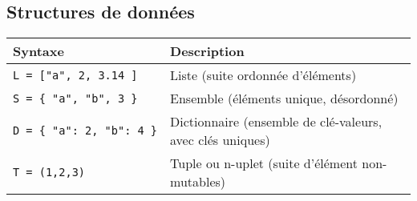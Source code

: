 \documentclass[]{article}
\begin{document}
\hypertarget{structures-de-donnuxe9es}{%
\subsection{Structures de données}\label{structures-de-donnuxe9es}}

\begin{longtable}[]{@{}ll@{}}
\toprule
\begin{minipage}[b]{0.28\columnwidth}\raggedright
Syntaxe\strut
\end{minipage} & \begin{minipage}[b]{0.67\columnwidth}\raggedright
Description\strut
\end{minipage}\tabularnewline
\midrule
\endhead
\begin{minipage}[t]{0.28\columnwidth}\raggedright
\texttt{L\ =\ {[}"a",\ 2,\ 3.14\ {]}}\strut
\end{minipage} & \begin{minipage}[t]{0.67\columnwidth}\raggedright
Liste (suite ordonnée d'éléments)\strut
\end{minipage}\tabularnewline
\begin{minipage}[t]{0.28\columnwidth}\raggedright
\texttt{S\ =\ \{\ "a",\ "b",\ 3\ \}}\strut
\end{minipage} & \begin{minipage}[t]{0.67\columnwidth}\raggedright
Ensemble (éléments unique, désordonné)\strut
\end{minipage}\tabularnewline
\begin{minipage}[t]{0.28\columnwidth}\raggedright
\texttt{D\ =\ \{\ "a":\ 2,\ "b":\ 4\ \}}\strut
\end{minipage} & \begin{minipage}[t]{0.67\columnwidth}\raggedright
Dictionnaire (ensemble de clé-valeurs, avec clés uniques)\strut
\end{minipage}\tabularnewline
\begin{minipage}[t]{0.28\columnwidth}\raggedright
\texttt{T\ =\ (1,2,3)}\strut
\end{minipage} & \begin{minipage}[t]{0.67\columnwidth}\raggedright
Tuple ou n-uplet (suite d'élément non-mutables)\strut
\end{minipage}\tabularnewline
\bottomrule
\end{longtable}
\end{document}
